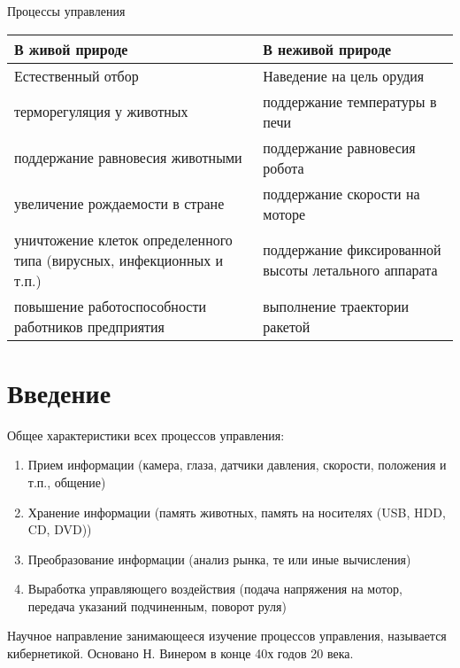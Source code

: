 \documentclass[../TAU.tex]{subfiles}
\theoremstyle{plain}
\theoremstyle{definition}
\theoremstyle{remark}
\theoremstyle{plain}
\begin{document}
\begin{center}
Процессы управления\\ [4pt]
\begin{tabular}{|p{5.5cm}|p{5.5cm}|}
  \hline
  В живой природе & В неживой природе \\ [4pt]
  \hline
  Естественный отбор & Наведение на цель орудия \\
  \hline
  терморегуляция у животных & поддержание температуры в печи\\
  \hline
  поддержание равновесия животными & поддержание равновесия робота\\
  \hline
  увеличение рождаемости в стране & поддержание скорости на моторе\\
  \hline
  уничтожение клеток определенного типа (вирусных, инфекционных и т.п.)& поддержание фиксированной высоты летального аппарата\\
  \hline
  повышение работоспособности работников предприятия & выполнение траектории ракетой\\
  \hline
\end{tabular}
\end{center}




\section{Введение}

Общее характеристики всех процессов управления:
\begin{enumerate}
\item Прием информации (камера, глаза, датчики давления, скорости, положения и т.п., общение)\\
\item Хранение информации (память животных, память на носителях (USB, HDD, CD, DVD))\\
\item Преобразование информации (анализ рынка, те или иные вычисления)\\
\item Выработка управляющего воздействия (подача напряжения на мотор, передача указаний подчиненным, поворот руля)
\end{enumerate}

Научное направление занимающееся изучение процессов управления, называется кибернетикой. Основано Н. Винером в конце 40х годов 20 века.
\end{document}
